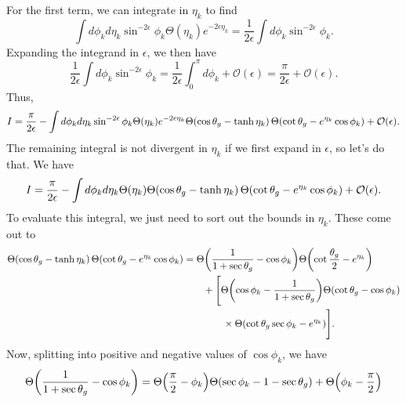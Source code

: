\documentclass[11pt,twoside,reqno]{amsart}
\theoremstyle{plain}
\theoremstyle{remark}
\theoremstyle{definition}
\theoremstyle{remark}
\theoremstyle{definition}
\theoremstyle{definition}
\newcommand{\cO}{\mathcal{O}}
\begin{document}
	For the first term, we can integrate in $\eta_k$ to find
	\begin{equation}
		\int d\phi_k d\eta_k \sin^{-2\epsilon}\phi_k \Theta(\eta_k) e^{-2\epsilon\eta_k} = \frac{1}{2\epsilon} \int d\phi_k \sin^{-2\epsilon}\phi_k.
	\end{equation}
	Expanding the integrand in $\epsilon$, we then have
	\begin{equation}
		\frac{1}{2\epsilon} \int d\phi_k \sin^{-2\epsilon}\phi_k = \frac{1}{2\epsilon} \int_0^\pi d\phi_k + \cO(\epsilon) = \frac{\pi}{2\epsilon} + \cO(\epsilon).
	\end{equation}
	Thus,
	\begin{equation}
		I = \frac{\pi}{2\epsilon} - \int d\phi_k d\eta_k \sin^{-2\epsilon}\phi_k \Theta(\eta_k) e^{-2\epsilon\eta_k} \Theta(\cos\theta_g - \tanh\eta_k)\,\Theta\qty(\cot\theta_g - e^{\eta_k}\cos\phi_k) + \cO(\epsilon).
	\end{equation}
	The remaining integral is not divergent in $\eta_k$ if we first expand in $\epsilon$, so let's do that. We have
	\begin{equation}\label{eq:integral with divergence extracted}
		I = \frac{\pi}{2\epsilon} - \int d\phi_k d\eta_k \Theta(\eta_k) \Theta(\cos\theta_g - \tanh\eta_k)\,\Theta\qty(\cot\theta_g - e^{\eta_k}\cos\phi_k) + \cO(\epsilon).
	\end{equation}
	To evaluate this integral, we just need to sort out the bounds in $\eta_k$. These come out to
	\begin{equation}
	\begin{aligned}
		\Theta(\cos\theta_g - \tanh\eta_k)\,\Theta\qty(\cot\theta_g - e^{\eta_k}\cos\phi_k) &= \Theta\qty(\frac{1}{1+\sec\theta_g} - \cos\phi_k)\Theta\qty(\cot\frac{\theta_g}{2} - e^{\eta_k}) \\
			&\qquad+ \Bigg[\Theta\qty(\cos\phi_k - \frac{1}{1+\sec\theta_g})\Theta(\cot\theta_g - \cos\phi_k)\\
			&\qquad\qquad \times \Theta\qty(\cot\theta_g\sec\phi_k - e^{\eta_k}) \Bigg].
	\end{aligned}
	\end{equation}
	Now, splitting into positive and negative values of $\cos\phi_k$, we have
	\begin{equation}
		\Theta\qty(\frac{1}{1+\sec\theta_g} - \cos\phi_k) = \Theta\qty(\frac{\pi}{2} - \phi_k)\Theta\qty(\sec\phi_k - 1 - \sec\theta_g) + \Theta\qty(\phi_k - \frac{\pi}{2})
	\end{equation}
\end{document}
